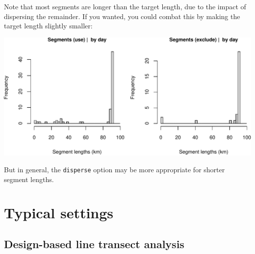 \documentclass[
]{book}
\newenvironment{Shaded}{\begin{snugshade}}{\end{snugshade}}
\newcommand{\CommentTok}[1]{\textcolor[rgb]{0.56,0.35,0.01}{\textit{#1}}}
\newcommand{\DataTypeTok}[1]{\textcolor[rgb]{0.13,0.29,0.53}{#1}}
\newcommand{\DecValTok}[1]{\textcolor[rgb]{0.00,0.00,0.81}{#1}}
\newcommand{\KeywordTok}[1]{\textcolor[rgb]{0.13,0.29,0.53}{\textbf{#1}}}
\newcommand{\NormalTok}[1]{#1}
\newcommand{\OperatorTok}[1]{\textcolor[rgb]{0.81,0.36,0.00}{\textbf{#1}}}
\newcommand{\OtherTok}[1]{\textcolor[rgb]{0.56,0.35,0.01}{#1}}
\newcommand{\StringTok}[1]{\textcolor[rgb]{0.31,0.60,0.02}{#1}}
\begin{document}
Note that most segments are longer than the target length, due to the impact of dispersing the remainder. If you wanted, you could combat this by making the target length slightly smaller:

\begin{Shaded}
\end{Shaded}

\includegraphics{figures/unnamed-chunk-459-1.pdf}

But in general, the \texttt{disperse} option may be more appropriate for shorter segment lengths.

\hypertarget{typical-settings}{%
\section*{Typical settings}\label{typical-settings}}

\hypertarget{design-based-line-transect-analysis}{%
\subsection*{Design-based line transect analysis}\label{design-based-line-transect-analysis}}
\end{document}
